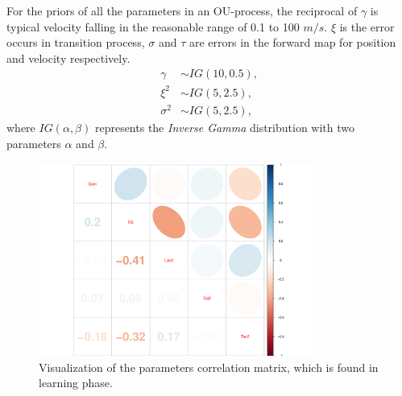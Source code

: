 \documentclass{beamer}
\begin{document}
\begin{frame}
For the priors of all the parameters in an OU-process, the reciprocal of $\gamma$ is typical velocity falling in the reasonable range of 0.1 to 100 $m/s$. $\xi$ is the error occurs in transition process, $\sigma$ and $\tau$ are errors in the forward map for position and velocity respectively. 
\begin{align*}
\gamma   &\sim IG(10,0.5),\\
\xi^2        &\sim IG(5,2.5),\\
\sigma^2 &\sim IG(5,2.5),
\end{align*}
where $IG(\alpha,\beta)$ represents the \textit{Inverse Gamma} distribution with two parameters $\alpha$ and $\beta$. 
\end{frame}


\begin{frame}
\begin{figure}[h]
\centering
\includegraphics[width=0.8\textwidth]{../Chapters/05MCMCOU/plots/realdatalearningcorMatrix.pdf}
\caption{Visualization of the parameters correlation matrix, which is found in learning phase. }\label{realdatacorMatrix}
\end{figure}

\end{frame}
\end{document}

